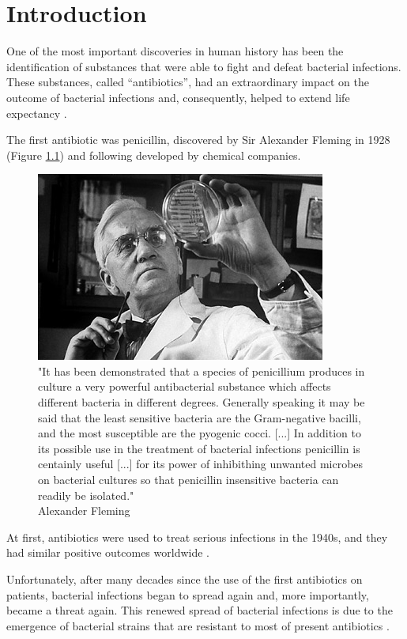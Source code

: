 \documentclass[11pt]{report}
\begin{document}
\tableofcontents

\chapter{Introduction}
One of the most important discoveries in human history has been the identification of substances that were able to fight and defeat bacterial infections.
These substances, called ``antibiotics'', had an extraordinary impact on the outcome of bacterial infections and, consequently, helped to extend life expectancy \cite{ventola2015antibiotic}.

The first antibiotic was penicillin, discovered by Sir Alexander Fleming in 1928 (Figure \ref{fleming}) and following developed by chemical companies.

\begin{figure}[htp]
\centering
\includegraphics[scale=1.10]{img/fleming.jpg}
\caption{"It has been demonstrated that a species of penicillium produces in culture a very powerful antibacterial substance which affects different bacteria in different degrees. Generally speaking it may be said that the least sensitive bacteria are the Gram-negative bacilli, and the most susceptible are the pyogenic cocci. [...]
In addition to its possible use in the treatment of bacterial infections penicillin is centainly useful [...] for its power of inhibithing unwanted microbes on bacterial cultures so that penicillin insensitive bacteria can readily be isolated."\\
Alexander Fleming}
\label{fleming}
\end{figure}

\clearpage
At first, antibiotics were used to treat serious infections in the 1940s, and they had similar positive outcomes worldwide \cite{Spellberg2014}.

Unfortunately, after many decades since the use of the first antibiotics on patients, bacterial infections began to spread again and, more importantly, became a threat again.
This renewed spread of bacterial infections is due to the emergence of bacterial strains that are resistant to most of present antibiotics \cite{ventola2015antibiotic}.
\end{document}
